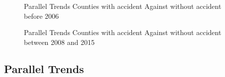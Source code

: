 \documentclass[
  8pt,
  12pt]{article}
\begin{document}
\begin{figure}


\caption{\label{fig-trends_past}Parallel Trends Counties with accident
Against without accident before 2006}

\end{figure}%

\begin{figure}


\caption{\label{fig-trends_mid}Parallel Trends Counties with accident
Against without accident between 2008 and 2015}

\end{figure}%

\subsection{Parallel Trends}\label{parallel-trends}
\end{document}
